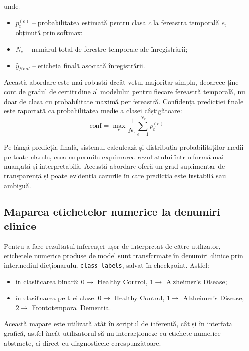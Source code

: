 \documentclass[12pt,a4paper]{report}
\theoremstyle{definition}
\theoremstyle{remark}
\begin{document}
\noindent unde:
\begin{itemize}
    \item $p_c^{(e)}$ -- probabilitatea estimată pentru clasa $c$ la fereastra temporală $e$, obținută prin softmax;
    \item $N_e$ -- numărul total de ferestre temporale ale înregistrării;
    \item $\hat{y}_{final}$ -- eticheta finală asociată înregistrării.
\end{itemize}

Această abordare este mai robustă decât votul majoritar simplu, deoarece ține cont de gradul de certitudine al modelului pentru fiecare fereastră temporală, nu doar de clasa cu probabilitate maximă per fereastră. Confidența predicției finale este raportată ca probabilitatea medie a clasei câștigătoare:
\begin{equation}
    \text{conf} = \max_{c} \frac{1}{N_e} \sum_{e=1}^{N_e} p_c^{(e)}
    \label{eq:final_confidence}
\end{equation}

Pe lângă predicția finală, sistemul calculează și distribuția probabilităților medii pe toate clasele, ceea ce permite exprimarea rezultatului într-o formă mai nuanțată și interpretabilă. Această abordare oferă un grad suplimentar de transparență și poate evidenția cazurile în care predicția este instabilă sau ambiguă.

\subsection{Maparea etichetelor numerice la denumiri clinice}

Pentru a face rezultatul inferenței ușor de interpretat de către utilizator, etichetele numerice produse de model sunt transformate în denumiri clinice prin intermediul dicționarului \texttt{class\_labels}, salvat în checkpoint. Astfel:
\begin{itemize}
    \item în clasificarea binară: $0 \rightarrow$ Healthy Control, $1 \rightarrow$ Alzheimer's Disease;
    \item în clasificarea pe trei clase: $0 \rightarrow$ Healthy Control, $1 \rightarrow$ Alzheimer's Disease, $2 \rightarrow$ Frontotemporal Dementia.
\end{itemize}

Această mapare este utilizată atât în scriptul de inferență, cât și în interfața grafică, astfel încât utilizatorul să nu interacționeze cu etichete numerice abstracte, ci direct cu diagnosticele corespunzătoare.
\end{document}
